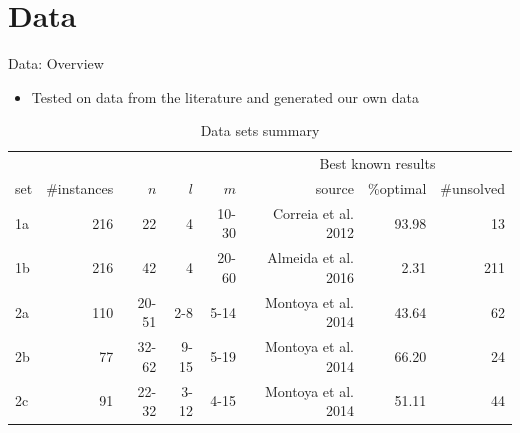 \documentclass{beamer}
\begin{document}
\section{Data}
\begin{frame}{Data: Overview}
	\begin{itemize}
		\item Tested on data from the literature and generated our own data\pause
	\end{itemize}
\begin{table}[tpb]
	\begin{adjustwidth}{-0.5cm}{}
    \setlength{\tabcolsep}{3pt}
    \centering
    \small
	\caption{Data sets summary}
	\begin{tabular}{@{}lrrrrrrr@{}}
		\toprule
		&  &  &  &  & \multicolumn{3}{c}{Best known results}\\ 
        \cmidrule(l){6-8} 
		set & \multicolumn{1}{l}{\#instances} & $n$ & $l$ & $m$ & source & \multicolumn{1}{r}{\%optimal} & {\color{red} \#unsolved} \\ \midrule
		1a     & 216 & 22 & 4 & 10-30 & Correia et al. 2012 & 93.98 & {\color{red} 13}\\
		1b     & 216& 42 & 4 & 20-60 & Almeida et al. 2016 & 2.31 & {\color{red} 211} \\ \midrule
		2a     & 110 & 20-51 & 2-8 & 5-14 & Montoya et al. 2014 & 43.64 & {\color{red} 62} \\
		2b     & 77 & 32-62 & 9-15 & 5-19 & Montoya et al. 2014 & 66.20 & {\color{red} 24} \\
		2c     & 91 & 22-32 & 3-12 & 4-15 & Montoya et al. 2014 & 51.11 & {\color{red} 44} \\ \bottomrule
	\end{tabular}
    \end{adjustwidth}
	\label{tab:data}
\end{table}

\end{frame}
\end{document}
